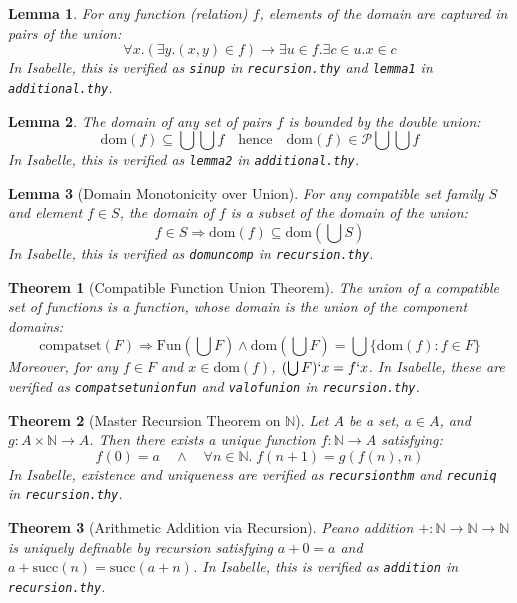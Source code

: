 \documentclass[10pt,a4paper]{article}
\newtheorem{theorem}{Theorem}[section]
\newtheorem{lemma}{Lemma}
\newcommand{\dom}{\mbox{dom}}
\newcommand{\Fun}{\mbox{Fun}}
\newcommand{\compatset}{\mbox{compatset}}
\newcommand{\Nat}{\mathbb{N}}
\newcommand{\Pow}{\mathcal{P}}
\newcommand{\Union}{\bigcup}
\begin{document}
\begin{lemma}
For any function (relation) $f$, elements of the domain are captured in pairs of the union:
\[
\forall x. (\exists y.(x,y)\in f) \longrightarrow \exists u\in f.\exists c\in u.x\in c
\]
In Isabelle, this is verified as \texttt{sinup} in \texttt{recursion.thy} and \texttt{lemma1} in \texttt{additional.thy}.
\end{lemma}

\begin{lemma}
The domain of any set of pairs $f$ is bounded by the double union:
\[
\dom(f)\subseteq \Union\Union f \quad \text{hence} \quad \dom(f)\in \Pow\Union\Union f
\]
In Isabelle, this is verified as \texttt{lemma2} in \texttt{additional.thy}.
\end{lemma}

\begin{lemma}[Domain Monotonicity over Union]
For any compatible set family $S$ and element $f \in S$, the domain of $f$ is a subset of the domain of the union:
\[
f \in S \Longrightarrow \dom(f) \subseteq \dom(\Union S)
\]
In Isabelle, this is verified as \texttt{domuncomp} in \texttt{recursion.thy}.
\end{lemma}

\begin{theorem}[Compatible Function Union Theorem]
The union of a compatible set of functions is a function, whose domain is the union of the component domains:
\[
\compatset(F) \Longrightarrow \Fun(\Union F) \land \dom(\Union F) = \Union \{\dom(f) : f \in F\}
\]
Moreover, for any $f \in F$ and $x \in \dom(f)$, $(\Union F)`x = f`x$.
In Isabelle, these are verified as \texttt{compatsetunionfun} and \texttt{valofunion} in \texttt{recursion.thy}.
\end{theorem}

\begin{theorem}[Master Recursion Theorem on $\Nat$]
Let $A$ be a set, $a \in A$, and $g : A \times \Nat \to A$. Then there exists a unique function $f : \Nat \to A$ satisfying:
\[
f(0) = a \quad \land \quad \forall n \in \Nat. \; f(n+1) = g(f(n), n)
\]
In Isabelle, existence and uniqueness are verified as \texttt{recursionthm} and \texttt{recuniq} in \texttt{recursion.thy}.
\end{theorem}

\begin{theorem}[Arithmetic Addition via Recursion]
Peano addition $+ : \Nat \to \Nat \to \Nat$ is uniquely definable by recursion satisfying $a + 0 = a$ and $a + \text{succ}(n) = \text{succ}(a + n)$.
In Isabelle, this is verified as \texttt{addition} in \texttt{recursion.thy}.
\end{theorem}
\end{document}
